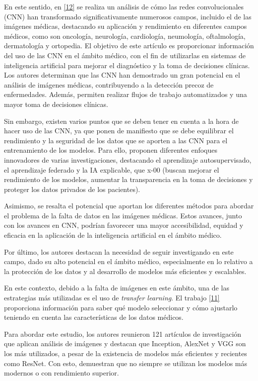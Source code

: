 \documentclass[11pt, a4paper]{article}
\numberwithin{equation}{section}
\begin{document}
En este sentido, en \hyperlink{ref:12}{[12]} se realiza un análisis de cómo las redes convolucionales (CNN) han transformado significativamente numerosos campos, incluido el de las imágenes médicas, destacando su aplicación y rendimiento en diferentes campos médicos, como son oncología, neurología, cardiología, neumología, oftalmología, dermatología y ortopedia. El objetivo de este artículo es proporcionar información del uso de las CNN en el ámbito médico, con el fin de utilizarlas en sistemas de inteligencia artificial para mejorar el diagnóstico y la toma de decisiones clínicas. Los autores determinan que las CNN han demostrado un gran potencial en el análisis de imágenes médicas, contribuyendo a la detección precoz de enfermedades. Además, permiten realizar flujos de trabajo automatizados y una mayor toma de decisiones clínicas.

Sin embargo, existen varios puntos que se deben tener en cuenta a la hora de hacer uso de las CNN, ya que ponen de manifiesto que se debe equilibrar el rendimiento y la seguridad de los datos que se aporten a las CNN para el entrenamiento de los modelos. Para ello, proponen diferentes enfoques innovadores de varias investigaciones, destacando el aprendizaje autosupervisado, el aprendizaje federado y la IA explicable, que x-00 (buscan mejorar el rendimiento de los modelos, aumentar la transparencia en la toma de decisiones y proteger los datos privados de los pacientes).

Asimismo, se resalta el potencial que aportan los diferentes métodos para abordar el problema de la falta de datos en las imágenes médicas. Estos avances, junto con los avances en CNN, podrían favorecer una mayor accesibilidad, equidad y eficacia en la aplicación de la inteligencia artificial en el ámbito médico.

Por último, los autores destacan la necesidad de seguir investigando en este campo, dado su alto potencial en el ámbito médico, especialmente en lo relativo a la protección de los datos y al desarrollo de modelos más eficientes y escalables.

En este contexto, debido a la falta de imágenes en este ámbito, una de las estrategias más utilizadas es el uso de \textit{transfer learning}. El trabajo \hyperlink{ref:11}{[11]} proporciona información para saber qué modelo seleccionar y cómo ajustarlo teniendo en cuenta las características de los datos médicos.

Para abordar este estudio, los autores reunieron 121 artículos de investigación que aplican análisis de imágenes y destacan que Inception, AlexNet y VGG son los más utilizados, a pesar de la existencia de modelos más eficientes y recientes como ResNet. Con esto, demuestran que no siempre se utilizan los modelos más modernos o con rendimiento superior.
\end{document}
